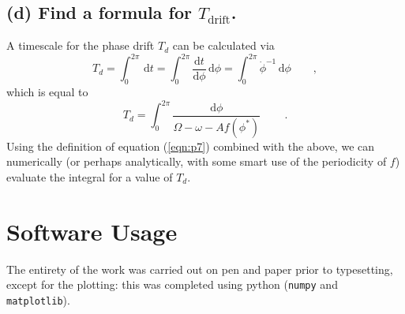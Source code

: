 \documentclass[draft]{agujournal2019}
\begin{document}
\subsection{(d) Find a formula for $T_\mathrm{drift}$. }
\label{ssec:p7d}

A timescale for the phase drift $T_d$ can be calculated via
\begin{equation*}
    T_{d} = \int_0^{2\pi} \,\mathrm{d}t = \int_0^{2\pi} \frac{\mathrm{d}t}{\mathrm{d}\phi}\,\mathrm{d}\phi = \int_0^{2\pi} \dot \phi^{-1}\,\mathrm{d}\phi \qquad ,
\end{equation*}
which is equal to 
\begin{equation*}
    T_{d} = \int_0^{2\pi} \frac{\mathrm{d}\phi}{\Omega - \omega -  A f(\phi^*)} \, \qquad .
\end{equation*}
Using the definition of equation (\ref{eqn:p7}) combined with the above, we can numerically (or perhaps analytically, with some smart use of the periodicity of $f$) evaluate the integral for a value of $T_d$.





















\clearpage
\section{Software Usage}
The entirety of the work was carried out on pen and paper prior to typesetting, except for the plotting: this was completed using python (\verb|numpy| and \verb|matplotlib|). 

\newpage















%
\end{document}
